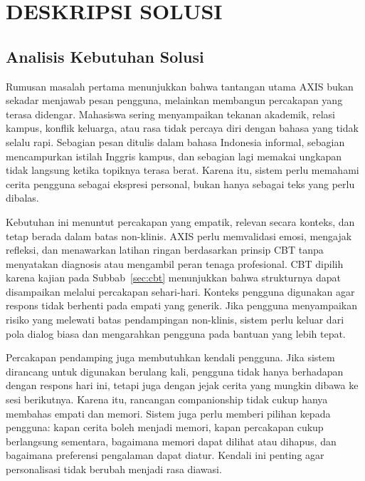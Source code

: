 
\chapter{DESKRIPSI SOLUSI}
\label{ch:deskripsi-solusi}


\section{Analisis Kebutuhan Solusi}
\label{sec:analisis-kebutuhan-solusi}

Rumusan masalah pertama menunjukkan bahwa tantangan utama AXIS bukan sekadar menjawab pesan pengguna, melainkan membangun percakapan yang terasa didengar. Mahasiswa sering menyampaikan tekanan akademik, relasi kampus, konflik keluarga, atau rasa tidak percaya diri dengan bahasa yang tidak selalu rapi. Sebagian pesan ditulis dalam bahasa Indonesia informal, sebagian mencampurkan istilah Inggris kampus, dan sebagian lagi memakai ungkapan tidak langsung ketika topiknya terasa berat. Karena itu, sistem perlu memahami cerita pengguna sebagai ekspresi personal, bukan hanya sebagai teks yang perlu dibalas.

Kebutuhan ini menuntut percakapan yang empatik, relevan secara konteks, dan tetap berada dalam batas non-klinis. AXIS perlu memvalidasi emosi, mengajak refleksi, dan menawarkan latihan ringan berdasarkan prinsip CBT tanpa menyatakan diagnosis atau mengambil peran tenaga profesional. CBT dipilih karena kajian pada Subbab~\ref{sec:cbt} menunjukkan bahwa strukturnya dapat disampaikan melalui percakapan sehari-hari. Konteks pengguna digunakan agar respons tidak berhenti pada empati yang generik. Jika pengguna menyampaikan risiko yang melewati batas pendampingan non-klinis, sistem perlu keluar dari pola dialog biasa dan mengarahkan pengguna pada bantuan yang lebih tepat.

Percakapan pendamping juga membutuhkan kendali pengguna. Jika sistem dirancang untuk digunakan berulang kali, pengguna tidak hanya berhadapan dengan respons hari ini, tetapi juga dengan jejak cerita yang mungkin dibawa ke sesi berikutnya. Karena itu, rancangan companionship tidak cukup hanya membahas empati dan memori. Sistem juga perlu memberi pilihan kepada pengguna: kapan cerita boleh menjadi memori, kapan percakapan cukup berlangsung sementara, bagaimana memori dapat dilihat atau dihapus, dan bagaimana preferensi pengalaman dapat diatur. Kendali ini penting agar personalisasi tidak berubah menjadi rasa diawasi.

